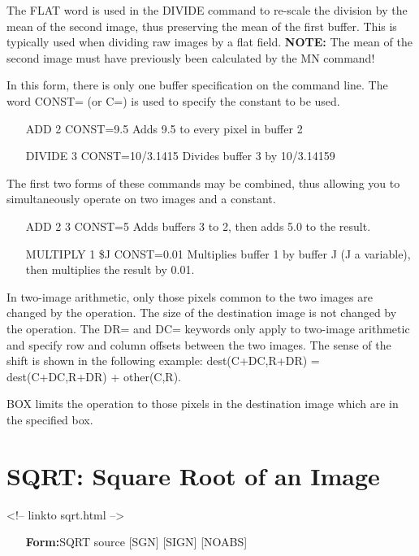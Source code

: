 The FLAT word is used in the DIVIDE command to re-scale the division by the
mean of the second image, thus preserving the mean of the first buffer.
This is typically used when dividing raw images by a flat field.
\textbf{NOTE:} The mean of the second image must have previously been
calculated by the MN command!


In this form, there is only one buffer specification on the command line.
The word CONST= (or C=) is used to specify the constant to be used.
\begin{itemize}
  \item[ADD 2 CONST=9.5\hfill]{Adds 9.5 to every pixel in buffer 2}
  \item[DIVIDE 3 CONST=10/3.1415\hfill]{  Divides buffer 3 by 10/3.14159}
\end{itemize}


The first two forms of these commands may be combined, thus allowing you to
simultaneously operate on two images and a constant.
\begin{itemize}
  \item[ADD 2 3 CONST=5\hfill]{Adds buffers 3 to 2, then adds 5.0
       to the result.}
  \item[MULTIPLY 1 \$J CONST=0.01\hfill]{ Multiplies buffer 1 by buffer J
       (J a variable), then multiplies the result by 0.01.}
\end{itemize}


In two-image arithmetic, only those pixels common to the two images are
changed by the operation.  The size of the destination image is not changed
by the operation.  The DR= and DC= keywords only apply to two-image
arithmetic and specify row and column offsets between the two images.  The
sense of the shift is shown in the following example: dest(C+DC,R+DR) =
dest(C+DC,R+DR) + other(C,R).

BOX limits the operation to those pixels in the destination image which are
in the specified box.

\section{SQRT: Square Root of an Image}
\begin{rawhtml}
<!-- linkto sqrt.html -->
\end{rawhtml}
\begin{itemize}
  \item[\textbf{Form:}SQRT source {[SGN]} {[SIGN]} {[NOABS]}\hfill]{}
\end{itemize}


